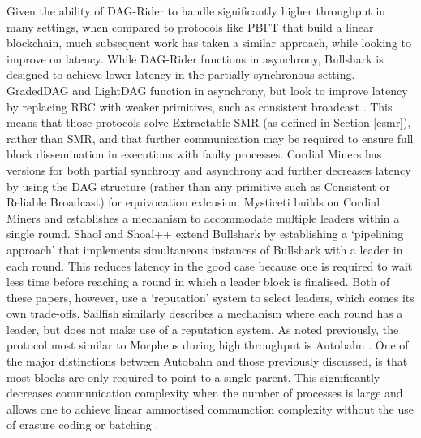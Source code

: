 \vspace{0.2cm} 
 Given the ability of DAG-Rider to handle significantly higher throughput in many settings, when compared to protocols like PBFT that build a linear blockchain, much subsequent work has taken a similar approach, while looking to improve on latency. While DAG-Rider functions in asynchrony, Bullshark \cite{spiegelman2022bullshark} is designed to achieve lower latency in the partially synchronous setting. 
 GradedDAG \cite{dai2023gradeddag} and LightDAG \cite{dai2024lightdag} function in asynchrony, but look to improve latency by replacing RBC \cite{bracha1987asynchronous} with weaker primitives, such as consistent broadcast \cite{srikanth1987simulating}. This means that those protocols solve Extractable SMR (as defined in Section \ref{esmr}), rather than SMR, and that further communication may be required to ensure full block dissemination in executions with faulty processes. Cordial Miners \cite{keidar2022cordial} has versions for both partial synchrony and asynchrony and further decreases latency 
by using the DAG structure (rather than any primitive such as Consistent or Reliable Broadcast) for equivocation exlcusion. Mysticeti \cite{babel2023mysticeti} builds on Cordial Miners and establishes a mechanism to  accommodate multiple leaders within a single round. Shaol \cite{spiegelman2023shoal} and Shoal++ \cite{arun2024shoal++} extend Bullshark by establishing a `pipelining approach' that implements simultaneous instances of Bullshark with a leader in each round. This reduces latency in the good case because one is required to wait less time before reaching a round in which a leader block is finalised. Both of these papers, however, use a `reputation' system to select leaders, which comes its own trade-offs. Sailfish \cite{shrestha2024sailfish} similarly describes a mechanism where each round has a leader, but does not make use of a reputation system. As noted previously, the protocol most similar to Morpheus during high throughput is Autobahn \cite{giridharan2024autobahn}. One of the major distinctions between Autobahn and those previously discussed, is that most blocks are only required to point to a single parent. This significantly decreases communication complexity when the number of processes is large and allows one to achieve linear ammortised communction complexity without the use of erasure coding \cite{alhaddad2022balanced,nayak2020improved} or batching \cite{miller2016honey}. 

 

 
 
